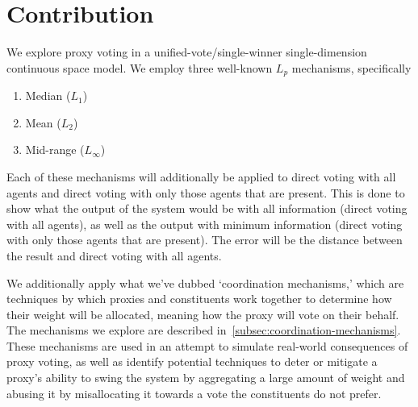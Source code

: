 \section{Contribution}\label{sec:contribution}
We explore proxy voting in a unified-vote/single-winner single-dimension
continuous space model.
We employ three well-known $L_p$ mechanisms, specifically
\begin{enumerate}
    \item {
        Median ($L_1$)
    }
    \item {
        Mean ($L_2$)
    }
    \item {
        Mid-range ($L_\infty$)
    }
\end{enumerate}
Each of these mechanisms will additionally be applied to direct voting with all
agents and direct voting with only those agents that are present.
This is done to show what the output of the system would be with all information
(direct voting with all agents), as well as the output with minimum information
(direct voting with only those agents that are present).
The error will be the distance between the result and direct voting with all agents.

We additionally apply what we've dubbed `coordination mechanisms,' which are
techniques by which proxies and constituents work together to determine how their
weight will be allocated, meaning how the proxy will vote on their behalf.
The mechanisms we explore are described
in~\autoref{subsec:coordination-mechanisms}.
These mechanisms are used in an attempt to simulate real-world consequences of proxy
voting, as well as identify potential techniques to deter or mitigate a proxy's
ability to swing the system by aggregating a large amount of weight and abusing it by
misallocating it towards a vote the constituents do not prefer.
%

